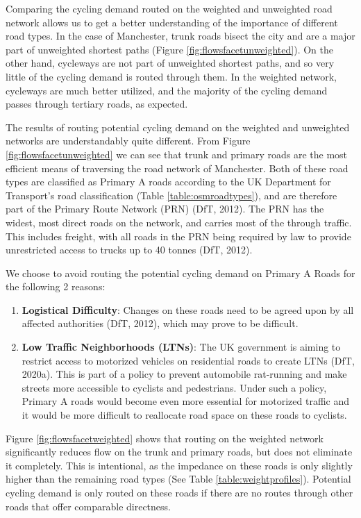 \documentclass[
]{article}
\providecommand{\tightlist}{%
  \setlength{\itemsep}{0pt}\setlength{\parskip}{0pt}}
\begin{document}
Comparing the cycling demand routed on the weighted and unweighted road
network allows us to get a better understanding of the importance of
different road types. In the case of Manchester, trunk roads bisect the
city and are a major part of unweighted shortest paths (Figure
\ref{fig:flowsfacetunweighted}). On the other hand, cycleways are not
part of unweighted shortest paths, and so very little of the cycling
demand is routed through them. In the weighted network, cycleways are
much better utilized, and the majority of the cycling demand passes
through tertiary roads, as expected.

The results of routing potential cycling demand on the weighted and
unweighted networks are understandably quite different. From Figure
\ref{fig:flowsfacetunweighted} we can see that trunk and primary roads
are the most efficient means of traversing the road network of
Manchester. Both of these road types are classified as Primary A roads
according to the UK Department for Transport's road classification
(Table \ref{table:osmroadtypes}), and are therefore part of the Primary
Route Network (PRN) (DfT, 2012). The PRN has the widest,
most direct roads on the network, and carries most of the through
traffic. This includes freight, with all roads in the PRN being required
by law to provide unrestricted access to trucks up to 40 tonnes
(DfT, 2012).

We choose to avoid routing the potential cycling demand on Primary A
Roads for the following 2 reasons:

\begin{enumerate}
\def\labelenumi{\arabic{enumi}.}
\tightlist
\item
  \textbf{Logistical Difficulty}: Changes on these roads need to be agreed
  upon by all affected authorities (DfT, 2012), which
  may prove to be difficult.
\item
  \textbf{Low Traffic Neighborhoods (LTNs)}: The UK government is aiming to
  restrict access to motorized vehicles on residential roads to create
  LTNs (DfT, 2020a). This is part of a policy to
  prevent automobile rat-running and make streets more accessible to
  cyclists and pedestrians. Under such a policy, Primary A roads would
  become even more essential for motorized traffic and it would be
  more difficult to reallocate road space on these roads to cyclists.
\end{enumerate}

Figure \ref{fig:flowsfacetweighted} shows that routing on the weighted
network significantly reduces flow on the trunk and primary roads, but
does not eliminate it completely. This is intentional, as the impedance
on these roads is only slightly higher than the remaining road types (See
Table \ref{table:weightprofiles}). Potential cycling demand is only
routed on these roads if there are no routes through other roads that
offer comparable directness.
\end{document}
